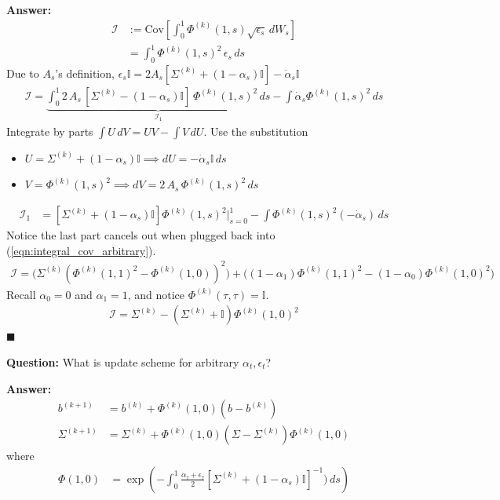 \documentclass[12pt,fleqn]{article}
\numberwithin{equation}{section}
\begin{document}
\noindent
\textbf{Answer:}
\begin{align}
	\mathcal I & := \text{Cov} \left[\int_0^1 \Phi^{(k)} (1, s) \sqrt{\epsilon_s} \, dW_s \right]\\
	& = \int_0^1 \Phi^{(k)}(1,s)^2 \, \epsilon_s \, ds
\end{align}
Due to $A_s$'s definition, $\epsilon_s \mathbb I = 2 A_s [\Sigma^{(k)} + (1-\alpha_s) \mathbb I] - \dot \alpha_s \mathbb I$
\begin{align}
	\mathcal I = \underbrace{ \int_0^1 2\, A_s\, [\Sigma^{(k)} - (1-\alpha_s) \mathbb I]\, \Phi^{(k)}(1,s)^2 \, ds }_{\mathcal I_1}- \int\dot \alpha_s \Phi^{(k)}(1,s)^2\, ds \label{eqn:integral_cov_arbitrary}
\end{align}
Integrate by parts $\int U \, dV = UV - \int V \, dU$. Use the substitution
\begin{itemize}
	\item $U = \Sigma^{(k)} + (1-\alpha_s ) \mathbb I \implies dU = - \dot \alpha_s \mathbb I \, ds$
	\item $V = \Phi^{(k)}(1,s)^2 \implies dV = 2 \, A_s \, \Phi^{(k)}(1,s)^2 \, ds$
\end{itemize}
\begin{align}
	\mathcal I_1 & =  [\Sigma^{(k)} + (1-\alpha_s ) \mathbb I] \Phi^{(k)}(1,s)^2 \Big |_{s=0}^1 - \int \Phi^{(k)}(1,s)^2 (- \dot \alpha_s) \, ds
\end{align}
Notice the last part cancels out when plugged back into (\ref{eqn:integral_cov_arbitrary}).
\begin{align}
	\mathcal I =  \Big (\Sigma^{(k)} (\Phi^{(k)}(1,1)^2 - \Phi^{(k)}(1,0))^2 \Big) +  \Big((1-\alpha_1) \Phi^{(k)}(1,1)^2 -  (1-\alpha_0) \Phi^{(k)}(1,0)^2 \Big)
\end{align}
Recall $\alpha_0 = 0$ and $\alpha_1= 1$, and notice $\Phi^{(k)}(\tau,\tau) = \mathbb I$.
\begin{align}
	\mathcal I = \Sigma^{(k)} - (\Sigma^{(k)} + \mathbb I) \Phi^{(k)} (1,0)^2
\end{align}
$\blacksquare$

\noindent
\textbf{Question:} What is update scheme for arbitrary $\alpha_t,\epsilon_t$?

\noindent
\textbf{Answer:} 
\begin{align}
	b^{(k+1)} & = b^{(k)} + \Phi^{(k)}(1,0) (b - b^{(k)})\\
	\Sigma^{(k+1)} &= \Sigma^{(k)} + \Phi^{(k)}(1,0) (\Sigma - \Sigma^{(k)} ) \Phi^{(k)}(1,0)
\end{align}
where 
\begin{align}
	\Phi(1,0) & = \exp \left( -\int_0^1 \frac{\dot \alpha_{\tau} + \epsilon_\tau}{2} [\Sigma^{(k)} + (1-\alpha_s) \mathbb I]^{-1} )\, ds\right)
\end{align}
\end{document}
